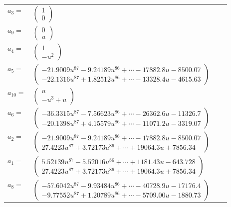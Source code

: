 \documentclass[1p]{elsarticle_modified}
\theoremstyle{definition}
\begin{document}
\begin{tabular}{m{7pt} m{180pt} m{7pt} m{180pt} }
\flushright $a_{3}=$&$\begin{pmatrix}1\\0\end{pmatrix}$ \\
\flushright $a_{9}=$&$\begin{pmatrix}0\\u\end{pmatrix}$ \\
\flushright $a_{4}=$&$\begin{pmatrix}1\\- u^2\end{pmatrix}$ \\
\flushright $a_{5}=$&$\begin{pmatrix}-21.9009 u^{87}-9.24189 u^{86}+\cdots-17882.8 u-8500.07\\-22.1316 u^{87}+1.82512 u^{86}+\cdots-13328.4 u-4615.63\end{pmatrix}$ \\
\flushright $a_{10}=$&$\begin{pmatrix}u\\- u^3+u\end{pmatrix}$ \\
\flushright $a_{6}=$&$\begin{pmatrix}-36.3315 u^{87}-7.56623 u^{86}+\cdots-26362.6 u-11326.7\\-20.1398 u^{87}+4.15579 u^{86}+\cdots-11071.2 u-3319.07\end{pmatrix}$ \\
\flushright $a_{2}=$&$\begin{pmatrix}-21.9009 u^{87}-9.24189 u^{86}+\cdots-17882.8 u-8500.07\\27.4223 u^{87}+3.72173 u^{86}+\cdots+19064.3 u+7856.34\end{pmatrix}$ \\
\flushright $a_{1}=$&$\begin{pmatrix}5.52139 u^{87}-5.52016 u^{86}+\cdots+1181.43 u-643.728\\27.4223 u^{87}+3.72173 u^{86}+\cdots+19064.3 u+7856.34\end{pmatrix}$ \\
\flushright $a_{8}=$&$\begin{pmatrix}-57.6042 u^{87}-9.93484 u^{86}+\cdots-40728.9 u-17176.4\\-9.77552 u^{87}+1.20789 u^{86}+\cdots-5709.00 u-1880.73\end{pmatrix}$ \\

\end{tabular}
\end{document}
